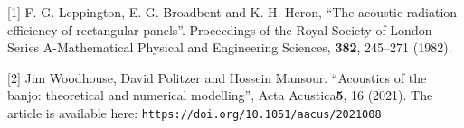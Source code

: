   \sectionreferences{}[1] F. G. Leppington, E. G. Broadbent and K. H. Heron, 
  “The acoustic radiation efficiency of rectangular panels”. Proceedings of the 
  Royal Society of London Series A-Mathematical Physical and Engineering 
  Sciences, \textbf{382}, 245–271 (1982). 

  [2] Jim Woodhouse, David Politzer and Hossein Mansour. ``Acoustics of the 
  banjo: theoretical and numerical modelling'', Acta Acustica\textbf{5}, 16 
  (2021). The article is available here: 
  \tt{}\rm{}\tt{}https://doi.org/10.1051/aacus/2021008\rm{} 